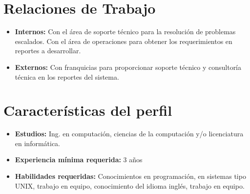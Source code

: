 \section{Relaciones de Trabajo}
\label{sec:rel_trabajo}


\begin{itemize}
 \item \textbf{Internos:} Con el área de soporte técnico para la resolución de problemas escalados. Con el área de operaciones para obtener los requerimientos en reportes a desarrollar.
 \item \textbf{Externos:} Con franquicias para proporcionar soporte técnico y consultoría técnica en los reportes del sistema.
\end{itemize}

\section{Características del perfil}
\label{sec:pperfil}


\begin{itemize}
 \item \textbf{Estudios:} Ing. en computación, ciencias de la computación y/o licenciatura en informática.
 \item \textbf{Experiencia mínima requerida:} 3 años
 \item \textbf{Habilidades requeridas:} Conocimientos en programación, en sistemas tipo UNIX, trabajo en equipo, conocimiento del idioma inglés, trabajo en equipo.
 \end{itemize}